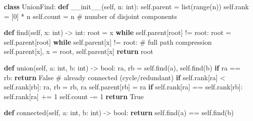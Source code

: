 \documentclass[11pt]{article}
\newenvironment{Shaded}{\begin{snugshade}}{\end{snugshade}}
\newcommand{\BuiltInTok}[1]{\textcolor[rgb]{0.50,0.55,0.55}{#1}}
\newcommand{\CommentTok}[1]{\textcolor[rgb]{0.48,0.49,0.49}{#1}}
\newcommand{\ControlFlowTok}[1]{\textcolor[rgb]{0.99,0.74,0.29}{\textbf{#1}}}
\newcommand{\DecValTok}[1]{\textcolor[rgb]{0.96,0.45,0.00}{#1}}
\newcommand{\FunctionTok}[1]{\textcolor[rgb]{0.56,0.27,0.68}{#1}}
\newcommand{\KeywordTok}[1]{\textcolor[rgb]{0.81,0.81,0.76}{\textbf{#1}}}
\newcommand{\NormalTok}[1]{\textcolor[rgb]{0.81,0.81,0.76}{#1}}
\newcommand{\OperatorTok}[1]{\textcolor[rgb]{0.81,0.81,0.76}{#1}}
\newcommand{\VariableTok}[1]{\textcolor[rgb]{0.15,0.68,0.68}{#1}}
\begin{document}
\begin{Shaded}
\begin{Highlighting}[]
\KeywordTok{class}\NormalTok{ UnionFind:}
    \KeywordTok{def} \FunctionTok{\_\_init\_\_}\NormalTok{(}\VariableTok{self}\NormalTok{, n: }\BuiltInTok{int}\NormalTok{):}
        \VariableTok{self}\NormalTok{.parent }\OperatorTok{=} \BuiltInTok{list}\NormalTok{(}\BuiltInTok{range}\NormalTok{(n))}
        \VariableTok{self}\NormalTok{.rank }\OperatorTok{=}\NormalTok{ [}\DecValTok{0}\NormalTok{] }\OperatorTok{*}\NormalTok{ n}
        \VariableTok{self}\NormalTok{.count }\OperatorTok{=}\NormalTok{ n  }\CommentTok{\# number of disjoint components}

    \KeywordTok{def}\NormalTok{ find(}\VariableTok{self}\NormalTok{, x: }\BuiltInTok{int}\NormalTok{) }\OperatorTok{{-}\textgreater{}} \BuiltInTok{int}\NormalTok{:}
\NormalTok{        root }\OperatorTok{=}\NormalTok{ x}
        \ControlFlowTok{while} \VariableTok{self}\NormalTok{.parent[root] }\OperatorTok{!=}\NormalTok{ root:}
\NormalTok{            root }\OperatorTok{=} \VariableTok{self}\NormalTok{.parent[root]}
        \ControlFlowTok{while} \VariableTok{self}\NormalTok{.parent[x] }\OperatorTok{!=}\NormalTok{ root:      }\CommentTok{\# full path compression}
            \VariableTok{self}\NormalTok{.parent[x], x }\OperatorTok{=}\NormalTok{ root, }\VariableTok{self}\NormalTok{.parent[x]}
        \ControlFlowTok{return}\NormalTok{ root}

    \KeywordTok{def}\NormalTok{ union(}\VariableTok{self}\NormalTok{, a: }\BuiltInTok{int}\NormalTok{, b: }\BuiltInTok{int}\NormalTok{) }\OperatorTok{{-}\textgreater{}} \BuiltInTok{bool}\NormalTok{:}
\NormalTok{        ra, rb }\OperatorTok{=} \VariableTok{self}\NormalTok{.find(a), }\VariableTok{self}\NormalTok{.find(b)}
        \ControlFlowTok{if}\NormalTok{ ra }\OperatorTok{==}\NormalTok{ rb:}
            \ControlFlowTok{return} \VariableTok{False}                   \CommentTok{\# already connected (cycle/redundant)}
        \ControlFlowTok{if} \VariableTok{self}\NormalTok{.rank[ra] }\OperatorTok{\textless{}} \VariableTok{self}\NormalTok{.rank[rb]:}
\NormalTok{            ra, rb }\OperatorTok{=}\NormalTok{ rb, ra}
        \VariableTok{self}\NormalTok{.parent[rb] }\OperatorTok{=}\NormalTok{ ra}
        \ControlFlowTok{if} \VariableTok{self}\NormalTok{.rank[ra] }\OperatorTok{==} \VariableTok{self}\NormalTok{.rank[rb]:}
            \VariableTok{self}\NormalTok{.rank[ra] }\OperatorTok{+=} \DecValTok{1}
        \VariableTok{self}\NormalTok{.count }\OperatorTok{{-}=} \DecValTok{1}
        \ControlFlowTok{return} \VariableTok{True}

    \KeywordTok{def}\NormalTok{ connected(}\VariableTok{self}\NormalTok{, a: }\BuiltInTok{int}\NormalTok{, b: }\BuiltInTok{int}\NormalTok{) }\OperatorTok{{-}\textgreater{}} \BuiltInTok{bool}\NormalTok{:}
        \ControlFlowTok{return} \VariableTok{self}\NormalTok{.find(a) }\OperatorTok{==} \VariableTok{self}\NormalTok{.find(b)}
\end{Highlighting}
\end{Shaded}
\end{document}
